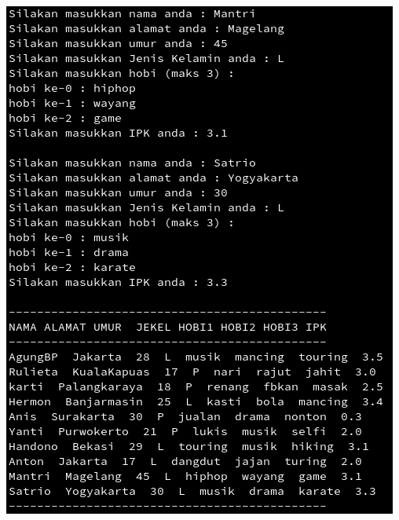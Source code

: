\documentclass[a4paper,12pt]{article}
\begin{document}
\begin{center}
    \includegraphics[scale=.7]{out-prak2-3.png} 
\end{center}
\newpage
\end{document}
